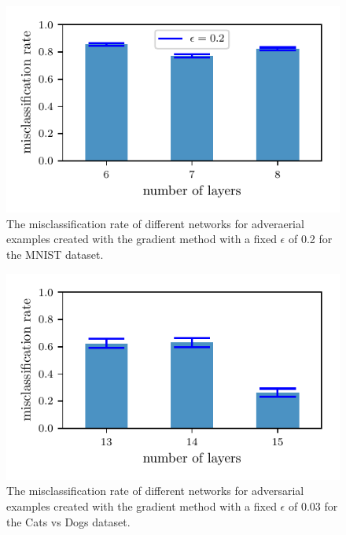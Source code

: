 \documentclass[%
 reprint,
 amsmath,amssymb,
 aps,
]{revtex4-1}
\begin{document}
\begin{figure}
\centering
\showthe\columnwidth
\includegraphics[width = 1\linewidth]{figures/mnist_grad_misclassificationrate.pdf}
\caption{The misclassification rate of different networks for adveraerial examples created with the gradient method with a fixed $\epsilon$ of 0.2 for the MNIST dataset.}
\label{fig:comp_grad_cats_vs_dogs}
\end{figure}

\begin{figure}
\centering
\showthe\columnwidth
\includegraphics[width = 1\linewidth]{figures/cvd_grad_misclassificationrate.pdf}
\caption{The misclassification rate of different networks for adversarial examples created with the gradient method with a fixed $\epsilon$ of 0.03 for the Cats vs Dogs dataset.}
\label{fig:comp_grad_cats_vs_dogs}
\end{figure}
\end{document}
